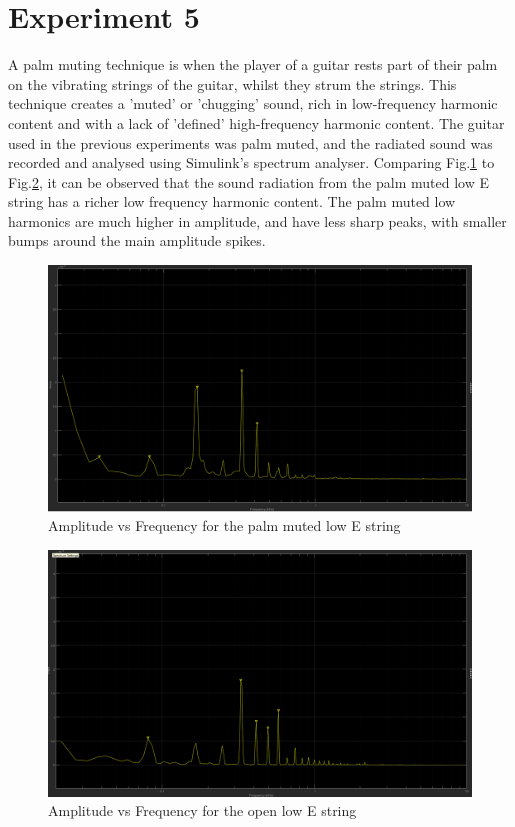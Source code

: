 \documentclass[11pt]{article}
\begin{document}
    \section{Experiment 5} 
        A palm muting technique is when the player of a guitar rests part of their palm on the vibrating strings of the guitar, whilst they strum the strings.
        This technique creates a 'muted' or 'chugging' sound, rich in low-frequency harmonic content and with a lack of 'defined' high-frequency harmonic content.
        The guitar used in the previous experiments was palm muted, and the radiated sound was recorded and analysed using Simulink's spectrum analyser.
        Comparing Fig.\ref{Epm} to Fig.\ref{Eopen}, it can be observed that the sound radiation from the palm muted low E string has a richer low frequency harmonic content.
        The palm muted low harmonics are much higher in amplitude, and have less sharp peaks, with smaller bumps around the main amplitude spikes.
        \begin{figure}[H]\label{Epm}
            \centering
            \includegraphics[scale=0.3]{resources/Epm.png}
            \caption{Amplitude vs Frequency for the palm muted low E string}
        \end{figure}
        \begin{figure}[H]\label{Eopen}
            \centering
            \includegraphics[scale=0.3]{resources/Eopen.png}
            \caption{Amplitude vs Frequency for the open low E string}
        \end{figure}
        
        
        
\end{document}
